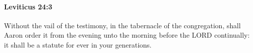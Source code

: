
		\paragraph{Leviticus 24:3} %
			\label{LEVITICUS-24-3}

			Without the vail of the testimony, in the tabernacle of the congregation, shall Aaron order it from the evening unto the morning before the LORD continually: it shall be a statute for ever in your generations.


